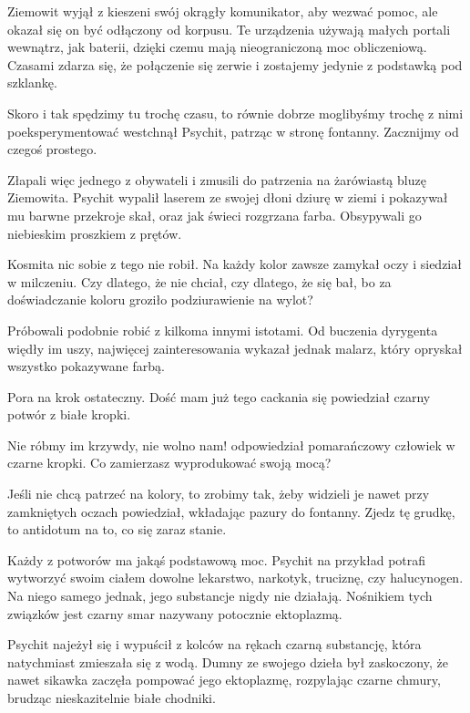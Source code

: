 Ziemowit wyjął z kieszeni swój okrągły komunikator, aby wezwać pomoc, ale okazał się on być odłączony od korpusu.
Te urządzenia używają małych portali wewnątrz, jak baterii, dzięki czemu mają nieograniczoną moc obliczeniową.
Czasami zdarza się, że połączenie się zerwie i zostajemy jedynie z podstawką pod szklankę.

\divider{}
\ds{} Skoro i tak spędzimy tu trochę czasu, to równie dobrze moglibyśmy trochę z nimi poeksperymentować \dm{} westchnął Psychit, patrząc w stronę fontanny. \dm{}
Zacznijmy od czegoś prostego. \de{}

Złapali więc jednego z obywateli i zmusili do patrzenia na żarówiastą bluzę Ziemowita.
Psychit wypalił laserem ze swojej dłoni dziurę w ziemi i pokazywał mu barwne przekroje skał, oraz jak świeci rozgrzana farba.
Obsypywali go niebieskim proszkiem z prętów.

Kosmita nic sobie z tego nie robił. 
Na każdy kolor zawsze zamykał oczy i siedział w milczeniu.
Czy dlatego, że nie chciał, czy dlatego, że się bał, bo za doświadczanie koloru groziło podziurawienie na wylot?

Próbowali podobnie robić z kilkoma innymi istotami.
Od buczenia dyrygenta więdły im uszy, najwięcej zainteresowania wykazał jednak malarz, który opryskał wszystko pokazywane farbą.

\ds{} Pora na krok ostateczny. Dość mam już tego cackania się \dm{} powiedział czarny potwór z białe kropki. \de{}

\ds{} Nie róbmy im krzywdy, nie wolno nam! \dm{} odpowiedział pomarańczowy człowiek w czarne kropki. \dm{} Co zamierzasz wyprodukować swoją mocą? \de{}

\ds{} Jeśli nie chcą patrzeć na kolory, to zrobimy tak, żeby widzieli je nawet przy zamkniętych oczach \ds{} powiedział, wkładając pazury do fontanny. \dm{} 
Zjedz tę grudkę, to antidotum na to, co się zaraz stanie. \de{}

Każdy z potworów ma jakąś podstawową moc. Psychit na przykład potrafi wytworzyć swoim ciałem dowolne lekarstwo, narkotyk, truciznę, czy halucynogen. Na niego samego jednak, jego substancje nigdy nie działają.
Nośnikiem tych związków jest czarny smar nazywany potocznie ektoplazmą.

Psychit najeżył się i wypuścił z kolców na rękach czarną substancję, która natychmiast zmieszała się z wodą.
Dumny ze swojego dzieła był zaskoczony, że nawet sikawka zaczęła pompować jego ektoplazmę, rozpylając czarne chmury, brudząc nieskazitelnie białe chodniki.

